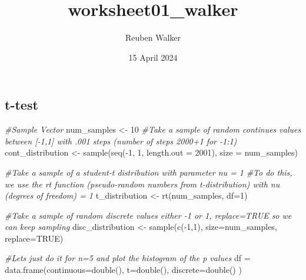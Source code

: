 \documentclass[
]{article}
\title{worksheet01\_walker}
\author{Reuben Walker}
\date{15 April 2024}
\newenvironment{Shaded}{\begin{snugshade}}{\end{snugshade}}
\newcommand{\AttributeTok}[1]{\textcolor[rgb]{0.77,0.63,0.00}{#1}}
\newcommand{\CommentTok}[1]{\textcolor[rgb]{0.56,0.35,0.01}{\textit{#1}}}
\newcommand{\ConstantTok}[1]{\textcolor[rgb]{0.00,0.00,0.00}{#1}}
\newcommand{\DecValTok}[1]{\textcolor[rgb]{0.00,0.00,0.81}{#1}}
\newcommand{\FunctionTok}[1]{\textcolor[rgb]{0.00,0.00,0.00}{#1}}
\newcommand{\NormalTok}[1]{#1}
\newcommand{\OtherTok}[1]{\textcolor[rgb]{0.56,0.35,0.01}{#1}}
\newcommand{\SpecialCharTok}[1]{\textcolor[rgb]{0.00,0.00,0.00}{#1}}
\begin{document}
\maketitle

\hypertarget{t-test}{%
\subsection{t-test}\label{t-test}}

\begin{Shaded}
\begin{Highlighting}[]
\CommentTok{\#Sample Vector}
\NormalTok{num\_samples }\OtherTok{\textless{}{-}} \DecValTok{10}
\CommentTok{\#Take a sample of random continues values between [{-}1,1] with .001 steps (number of steps 2000+1 for {-}1:1)}
\NormalTok{cont\_distribution }\OtherTok{\textless{}{-}} \FunctionTok{sample}\NormalTok{(}\FunctionTok{seq}\NormalTok{(}\SpecialCharTok{{-}}\DecValTok{1}\NormalTok{, }\DecValTok{1}\NormalTok{, }\AttributeTok{length.out =} \DecValTok{2001}\NormalTok{), }\AttributeTok{size =}\NormalTok{ num\_samples)}

\CommentTok{\#Take a sample of a student{-}t distribution with parameter nu = 1}
\CommentTok{\#To do this, we use the rt function (pseudo{-}random numbers from t{-}distribution) with nu (degrees of freedom) = 1}
\NormalTok{t\_distribution }\OtherTok{\textless{}{-}} \FunctionTok{rt}\NormalTok{(num\_samples, }\AttributeTok{df=}\DecValTok{1}\NormalTok{)}


\CommentTok{\#Take a sample of random discrete values either {-}1 or 1, replace=TRUE so we can keep sampling}
\NormalTok{disc\_distribution }\OtherTok{\textless{}{-}} \FunctionTok{sample}\NormalTok{(}\FunctionTok{c}\NormalTok{(}\SpecialCharTok{{-}}\DecValTok{1}\NormalTok{,}\DecValTok{1}\NormalTok{), }\AttributeTok{size=}\NormalTok{num\_samples, }\AttributeTok{replace=}\ConstantTok{TRUE}\NormalTok{)}

\CommentTok{\#Let\textquotesingle{}s just do it for n=5 and plot the histogram of the p values}
\NormalTok{df }\OtherTok{=} \FunctionTok{data.frame}\NormalTok{(}\AttributeTok{continuous=}\FunctionTok{double}\NormalTok{(),}
                \AttributeTok{t=}\FunctionTok{double}\NormalTok{(),}
                \AttributeTok{discrete=}\FunctionTok{double}\NormalTok{()}
\NormalTok{                )}


\end{Highlighting}
\end{Shaded}
\end{document}
